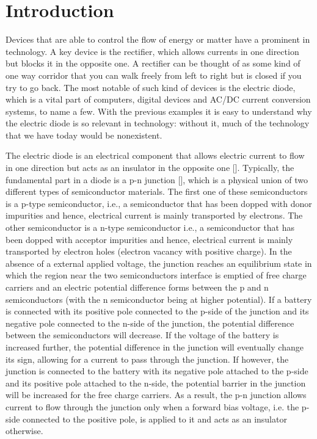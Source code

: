 
\chapter*{Introduction} %
\label{Introduction}

Devices that are able to control the flow of energy or matter have a prominent in technology. A key device is the rectifier, which allows currents in one direction but blocks it in the opposite one. A rectifier can be thought of as some kind of one way corridor that you can walk freely from left to right but is closed if you try to go back. The most notable of such kind of devices is the electric diode, which is a vital part of computers, digital devices and AC/DC current conversion systems, to name a few. With the previous examples it is easy to understand why the electric diode is so relevant in technology: without it, much of the technology that we have today would be nonexistent.

The electric diode is an electrical component that allows electric current to flow in one direction but acts as an insulator in the opposite one []. Typically, the fundamental part in a diode is a p-n junction [], which is a physical union of two different types of semiconductor materials. The first one of these semiconductors is a p-type semiconductor, i.e., a semiconductor that has been dopped with donor impurities and hence, electrical current is mainly transported by electrons. The other semiconductor is a n-type semiconductor i.e., a semiconductor that has been dopped with acceptor impurities and hence, electrical current is mainly transported by electron holes (electron vacancy with positive charge). In the absence of a external applied voltage, the junction reaches an equilibrium state in which the region near the two semiconductors interface is emptied of free charge carriers and an electric potential difference forms between the p and n semiconductors (with the n semiconductor being at higher potential). If a battery is connected with its positive pole connected to the p-side of the junction and its negative pole connected to the n-side of the junction, the potential difference between the semiconductors will decrease. If the voltage of the battery is increased further, the potential difference in the junction will eventually change its sign, allowing for a current to pass through the junction. If however, the junction is connected to the battery with its negative pole attached to the p-side and its positive pole attached to the n-side, the potential barrier in the junction will be increased for the free charge carriers. As a result, the p-n junction allows current to flow through the junction only when a forward bias voltage, i.e. the p-side connected to the positive pole, is applied to it and acts as an insulator otherwise.

